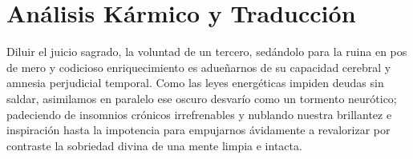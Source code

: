 \section{Análisis Kármico y Traducción}
\begin{figure}
  \vspace{-1.5em}
  \begin{center}
  \end{center}
  \vspace{-1.5em}
\end{figure}
Diluir el juicio sagrado, la voluntad de un tercero, sedándolo para la ruina en pos de mero y codicioso enriquecimiento es adueñarnos de su capacidad cerebral y amnesia perjudicial temporal. Como las leyes energéticas impiden deudas sin saldar, asimilamos en paralelo ese oscuro desvarío como un tormento neurótico; padeciendo de insomnios crónicos irrefrenables y nublando nuestra brillantez e inspiración hasta la impotencia para empujarnos ávidamente a revalorizar por contraste la sobriedad divina de una mente limpia e intacta.

